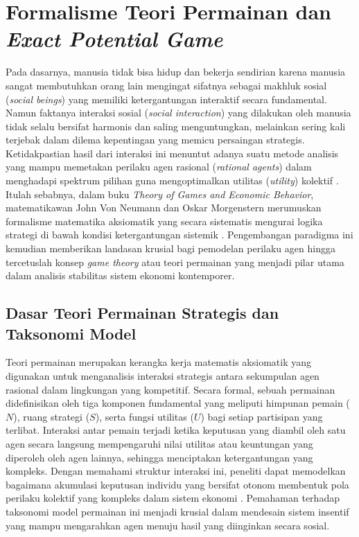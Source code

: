 \section{Formalisme Teori Permainan dan \textit{Exact Potential Game}}
Pada dasarnya, manusia tidak bisa hidup dan bekerja sendirian karena manusia sangat membutuhkan orang lain mengingat sifatnya sebagai makhluk sosial (\textit{social beings}) yang memiliki ketergantungan interaktif secara fundamental. Namun faktanya interaksi sosial (\textit{social interaction}) yang dilakukan oleh manusia tidak selalu bersifat harmonis dan saling menguntungkan, melainkan sering kali terjebak dalam dilema kepentingan yang memicu persaingan strategis. Ketidakpastian hasil dari interaksi ini menuntut adanya suatu metode analisis yang mampu memetakan perilaku agen rasional (\textit{rational agents}) dalam menghadapi spektrum pilihan guna mengoptimalkan utilitas (\textit{utility}) kolektif \cite{hidalgo_quantum_2006}. Itulah sebabnya, dalam buku \textit{Theory of Games and Economic Behavior}, matematikawan John Von Neumann dan Oskar Morgenstern merumuskan formalisme matematika aksiomatik yang secara sistematis mengurai logika strategi di bawah kondisi ketergantungan sistemik \cite{john_von_neumann_theory_1953}. Pengembangan paradigma ini kemudian memberikan landasan krusial bagi pemodelan perilaku agen hingga tercetuslah konsep \textit{game theory} atau teori permainan yang menjadi pilar utama dalam analisis stabilitas sistem ekonomi kontemporer.   

\subsection{Dasar Teori Permainan Strategis dan Taksonomi Model}
Teori permainan merupakan kerangka kerja matematis aksiomatik yang digunakan untuk menganalisis interaksi strategis antara sekumpulan agen rasional dalam lingkungan yang kompetitif. Secara formal, sebuah permainan didefinisikan oleh tiga komponen fundamental yang meliputi himpunan pemain ($N$), ruang strategi ($S$), serta fungsi utilitas ($U$) bagi setiap partisipan yang terlibat. Interaksi antar pemain terjadi ketika keputusan yang diambil oleh satu agen secara langsung mempengaruhi nilai utilitas atau keuntungan yang diperoleh oleh agen lainnya, sehingga menciptakan ketergantungan yang kompleks. Dengan memahami struktur interaksi ini, peneliti dapat memodelkan bagaimana akumulasi keputusan individu yang bersifat otonom membentuk pola perilaku kolektif yang kompleks dalam sistem ekonomi \cite{monderer_potential_1996}. Pemahaman terhadap taksonomi model permainan ini menjadi krusial dalam mendesain sistem insentif yang mampu mengarahkan agen menuju hasil yang diinginkan secara sosial.

